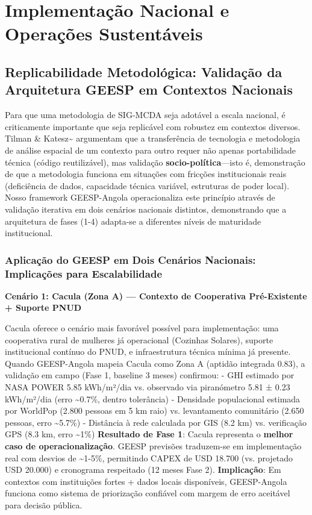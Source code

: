 \documentclass[12pt, a4paper]{article}
\begin{document}
\clearpage
\section{Implementação Nacional e Operações Sustentáveis}

\subsection{Replicabilidade Metodológica: Validação da Arquitetura GEESP em Contextos Nacionais}

Para que uma metodologia de SIG-MCDA seja adotável a escala nacional, é criticamente importante que seja replicável com robustez em contextos diversos. Tilman \& Katesz\textasciitilde{}\citep{Tilman2002} argumentam que a transferência de tecnologia e metodologia de análise espacial de um contexto para outro requer não apenas portabilidade técnica (código reutilizável), mas validação \textbf{socio-política}---isto é, demonstração de que a metodologia funciona em situações com fricções institucionais reais (deficiência de dados, capacidade técnica variável, estruturas de poder local). Nosso framework GEESP-Angola operacionaliza este princípio através de validação iterativa em dois cenários nacionais distintos, demonstrando que a arquitetura de fases (1-4) adapta-se a diferentes níveis de maturidade institucional.

\subsubsection{Aplicação do GEESP em Dois Cenários Nacionais: Implicações para Escalabilidade}

\textbf{Cenário 1: Cacula (Zona A) — Contexto de Cooperativa Pré-Existente + Suporte PNUD}

Cacula oferece o cenário mais favorável possível para implementação: uma cooperativa rural de mulheres já operacional (Cozinhas Solares), suporte institucional contínuo do PNUD, e infraestrutura técnica mínima já presente. Quando GEESP-Angola mapeia Cacula como Zona A (aptidão integrada 0.83), a validação em campo (Fase 1, baseline 3 meses) confirmou:
- GHI estimado por NASA POWER 5.85 kWh/m²/dia vs. observado via piranómetro 5.81 ± 0.23 kWh/m²/dia (erro \textasciitilde{}0.7\%, dentro tolerância)
- Densidade populacional estimada por WorldPop (2.800 pessoas em 5 km raio) vs. levantamento comunitário (2.650 pessoas, erro \textasciitilde{}5.7\%)
- Distância à rede calculada por GIS (8.2 km) vs. verificação GPS (8.3 km, erro \textasciitilde{}1\%)
\textbf{Resultado de Fase 1}: Cacula representa o 
\textbf{melhor caso de operacionalização}. GEESP previsões traduzem-se em implementação real com desvios de \textasciitilde{}1-5\%, permitindo CAPEX de USD 18.700 (vs. projetado USD 20.000) e cronograma respeitado (12 meses Fase 2).
\textbf{Implicação}: Em contextos com instituições fortes + dados locais disponíveis, GEESP-Angola funciona como sistema de priorização confiável com margem de erro aceitável para decisão pública.
\end{document}
